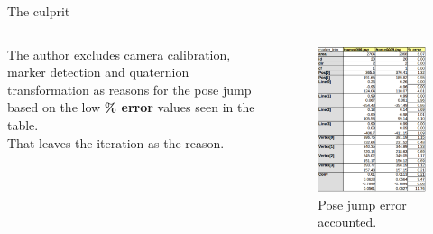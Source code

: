 \documentclass[10pt]{beamer}
\begin{document}
\begin{frame}[fragile]{The culprit}
  \begin{columns}
      The author excludes camera calibration, marker detection and quaternion transformation as reasons for the pose jump based on the low \textbf{\% error} values seen in the table.\\
      That leaves the iteration as the reason.
    \vspace{-0.5 cm}
      \begin{figure}
        \centering
        \includegraphics[scale=0.35]{table-extended.png}
        \caption{Pose jump error accounted.}
      \end{figure}
  \end{columns}
\end{frame}

\end{document}
